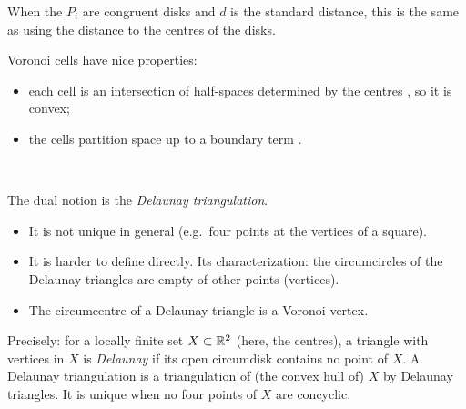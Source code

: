 When the $P_i$ are congruent disks and $d$ is the standard distance, this is the same as using
the distance to the centres of the disks. 

Voronoi cells have nice properties:
\begin{itemize}[nosep]
  \item each cell is an intersection of half-spaces determined by the centres
        , so it is convex;
  \item the cells partition space up to a boundary term .
\end{itemize}

\begin{center}
\\[2pt]
{\small {}}
\end{center}

The dual notion is the \emph{Delaunay triangulation}.
\begin{itemize}[nosep]
  \item It is not unique in general (e.g.\ four points at the vertices of a square).
  \item It is harder to define directly. Its characterization: the circumcircles of the
        Delaunay triangles are empty of other points (vertices).
  \item The circumcentre of a Delaunay triangle is a Voronoi vertex.
\end{itemize}
\begin{addedblock}
Precisely: for a locally finite set $X\subset\mathbb{R}^2$ (here, the centres), a triangle with vertices
in $X$ is \emph{Delaunay} if its open circumdisk contains no point of $X$. A Delaunay triangulation is
a triangulation of (the convex hull of) $X$ by Delaunay triangles. It is unique when no four
points of $X$ are concyclic.
\end{addedblock}

